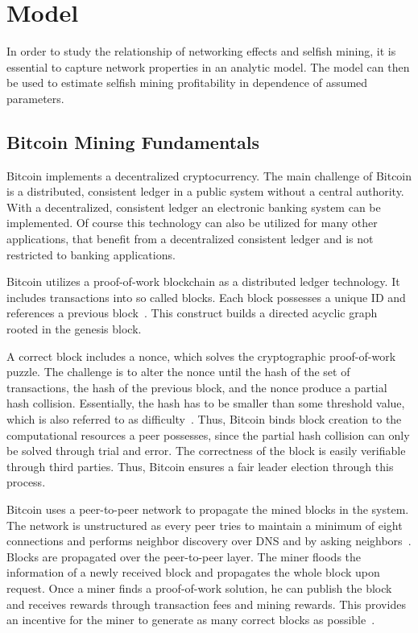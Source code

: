\chapter{Model}\label{chap:model}
In order to study the relationship of networking effects and selfish mining, it is essential to capture network properties in an analytic model. The model can then be used to estimate selfish mining profitability in dependence of assumed parameters.
\section{Bitcoin Mining Fundamentals}
Bitcoin implements a decentralized cryptocurrency. The main challenge of Bitcoin is a distributed, consistent ledger in a public system without a central authority. With a decentralized, consistent ledger an electronic banking system can be implemented. Of course this technology can also be utilized for many other applications, that benefit from a decentralized consistent ledger and is not restricted to banking applications.

Bitcoin utilizes a proof-of-work blockchain as a distributed ledger technology.
It includes transactions into so called blocks. Each block possesses a unique ID and references a previous block~\cite{tschorsch}. This construct builds a directed acyclic graph rooted in the genesis block.

A correct block includes a nonce, which solves the cryptographic proof-of-work puzzle. The challenge is to alter the nonce until the hash of the set of transactions, the hash of the previous block, and the nonce produce a partial hash collision. Essentially, the hash has to be smaller than some threshold value, which is also referred to as difficulty~\cite{tschorsch}.
Thus, Bitcoin binds block creation to the computational resources a peer possesses, since the partial hash collision can only be solved through trial and error. The correctness of the block is easily verifiable through third parties. Thus, Bitcoin ensures a fair leader election through this process.

Bitcoin uses a peer-to-peer network to propagate the mined blocks in the system. The network is unstructured as every peer tries to maintain a minimum of eight connections and performs neighbor discovery over DNS and by asking neighbors~\cite{tschorsch}. Blocks are propagated over the peer-to-peer layer. The miner floods the information of a newly received block and propagates the whole block upon request.
Once a miner finds a proof-of-work solution, he can publish the block and receives rewards through transaction fees and mining rewards. This provides an incentive for the miner to generate as many correct blocks as possible~\cite{1}.


